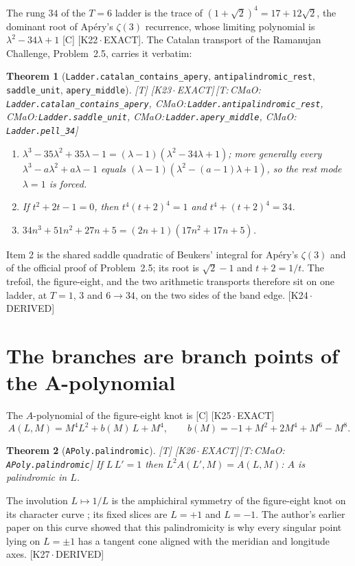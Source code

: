 \documentclass[11pt]{article}
\newtheorem{theorem}{Theorem}
\theoremstyle{definition}
\newcommand{\grade}[1]{\textsf{\small[#1]}}
\newcommand{\lean}[1]{\texttt{\small #1}}
\newcommand{\dtag}[1]{#1}
\begin{document}
The rung $34$ of the $T=6$ ladder is the trace of $(1+\sqrt2)^4=17+12\sqrt2$, the dominant root of Ap\'ery's $\zeta(3)$ recurrence, whose limiting polynomial is $\lambda^2-34\lambda+1$ \grade{C} \cite{Apery}\dtag{ \textsf{\small[K22\,$\cdot$\,EXACT]}}. The Catalan transport of the Ramanujan Challenge, Problem~2.5, carries it verbatim:
\begin{theorem}[\lean{Ladder.catalan\_contains\_apery}, \lean{antipalindromic\_rest}, \lean{saddle\_unit}, \lean{apery\_middle}]\grade{T}\dtag{ \textsf{\small[K23\,$\cdot$\,EXACT]}\,\textsf{\small[T:\,CMaO:\,\lean{Ladder.\allowbreak{}catalan\_\allowbreak{}contains\_\allowbreak{}apery}, CMaO:\,\lean{Ladder.\allowbreak{}antipalindromic\_\allowbreak{}rest}, CMaO:\,\lean{Ladder.\allowbreak{}saddle\_\allowbreak{}unit}, CMaO:\,\lean{Ladder.\allowbreak{}apery\_\allowbreak{}middle}, CMaO:\,\lean{Ladder.\allowbreak{}pell\_\allowbreak{}34}]}}
\begin{enumerate}[leftmargin=2em]
\item $\lambda^3-35\lambda^2+35\lambda-1=(\lambda-1)(\lambda^2-34\lambda+1)$; more generally every $\lambda^3-a\lambda^2+a\lambda-1$ equals $(\lambda-1)(\lambda^2-(a-1)\lambda+1)$, so the rest mode $\lambda=1$ is forced.
\item If $t^2+2t-1=0$, then $t^4(t+2)^4=1$ and $t^4+(t+2)^4=34$.
\item $34n^3+51n^2+27n+5=(2n+1)(17n^2+17n+5)$.
\end{enumerate}
\end{theorem}
Item 2 is the shared saddle quadratic of Beukers' integral for Ap\'ery's $\zeta(3)$ and of the official proof of Problem~2.5; its root is $\sqrt2-1$ and $t+2=1/t$. The trefoil, the figure-eight, and the two arithmetic transports therefore sit on one ladder, at $T=1$, $3$ and $6\to34$, on the two sides of the band edge.\dtag{ \textsf{\small[K24\,$\cdot$\,DERIVED]}}

\section{The branches are branch points of the A-polynomial}
The $A$-polynomial of the figure-eight knot is \grade{C} \cite{CCGLS,BorotEynard}\dtag{ \textsf{\small[K25\,$\cdot$\,EXACT]}}
\[ A(L,M)=M^4L^2+b(M)\,L+M^4,\qquad b(M)=-1+M^2+2M^4+M^6-M^8 . \]
\begin{theorem}[\lean{APoly.palindromic}]\grade{T}\dtag{ \textsf{\small[K26\,$\cdot$\,EXACT]}\,\textsf{\small[T:\,CMaO:\,\lean{APoly.\allowbreak{}palindromic}]}}
If $L\,L'=1$ then $L^2A(L',M)=A(L,M)$: $A$ is palindromic in $L$.
\end{theorem}
The involution $L\mapsto1/L$ is the amphichiral symmetry of the figure-eight knot on its character curve \cite{BorotEynard}; its fixed slices are $L=+1$ and $L=-1$. The author's earlier paper on this curve \cite{Hessian} showed that this palindromicity is why every singular point lying on $L=\pm1$ has a tangent cone aligned with the meridian and longitude axes.\dtag{ \textsf{\small[K27\,$\cdot$\,DERIVED]}}
\end{document}
